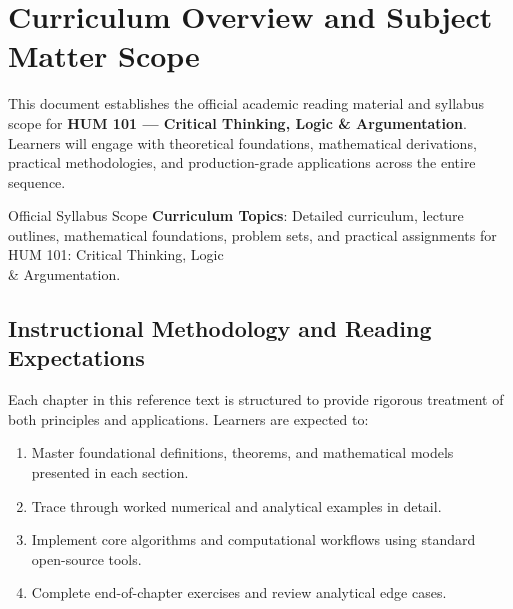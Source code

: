 \section{Curriculum Overview and Subject Matter Scope}

This document establishes the official academic reading material and syllabus scope for \textbf{HUM 101 --- Critical Thinking, Logic \& Argumentation}. Learners will engage with theoretical foundations, mathematical derivations, practical methodologies, and production-grade applications across the entire sequence.

\begin{InsightBox}{Official Syllabus Scope}
  \textbf{Curriculum Topics}: Detailed curriculum, lecture outlines, mathematical foundations, problem sets, and practical assignments for HUM 101: Critical Thinking, Logic \\& Argumentation.
\end{InsightBox}

\subsection{Instructional Methodology and Reading Expectations}

Each chapter in this reference text is structured to provide rigorous treatment of both principles and applications. Learners are expected to:
\begin{enumerate}
  \item Master foundational definitions, theorems, and mathematical models presented in each section.
  \item Trace through worked numerical and analytical examples in detail.
  \item Implement core algorithms and computational workflows using standard open-source tools.
  \item Complete end-of-chapter exercises and review analytical edge cases.
\end{enumerate}

